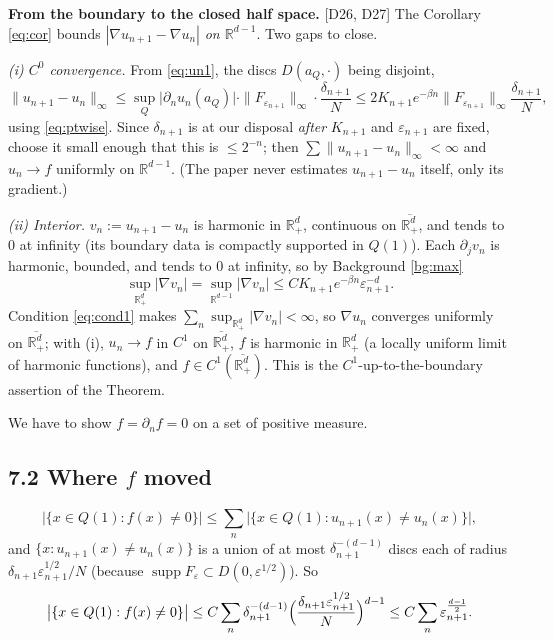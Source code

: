 \documentclass[11pt,reqno]{amsart}
\theoremstyle{plain}
\theoremstyle{definition}
\theoremstyle{plain}
\theoremstyle{definition}
\theoremstyle{remark}
\newcommand{\Rd}{\mathbb{R}^d_+}
\newcommand{\Rdm}{\mathbb{R}^{d-1}}
\newcommand{\nd}{\partial_n}
\DeclareMathOperator{\supp}{supp}
\newcommand{\Ledger}[1]{{\scriptsize\textsf{[#1]}}}
\begin{document}
\begin{filled}
\textbf{From the boundary to the closed half space.} \Ledger{D26, D27} The
Corollary \eqref{eq:cor} bounds $|\nabla u_{n+1}-\nabla u_n|$ \emph{on $\Rdm$}. Two
gaps to close.

\emph{(i) $C^0$ convergence.} From \eqref{eq:un1}, the discs $D(a_Q,\cdot)$ being
disjoint,
\[\|u_{n+1}-u_n\|_\infty
 \le\sup_{Q}\bigl|\nd u_n(a_Q)\bigr|\cdot\|F_{\varepsilon_{n+1}}\|_\infty\cdot
   \frac{\delta_{n+1}}N
 \le 2K_{n+1}e^{-\beta n}\|F_{\varepsilon_{n+1}}\|_\infty\frac{\delta_{n+1}}N,\]
using \eqref{eq:ptwise}. Since $\delta_{n+1}$ is at our disposal \emph{after}
$K_{n+1}$ and $\varepsilon_{n+1}$ are fixed, choose it small enough that this is
$\le2^{-n}$; then $\sum\|u_{n+1}-u_n\|_\infty<\infty$ and $u_n\to f$ uniformly on
$\Rdm$. (The paper never estimates $u_{n+1}-u_n$ itself, only its gradient.)

\emph{(ii) Interior.} $v_n:=u_{n+1}-u_n$ is harmonic in $\Rd$, continuous on
$\overline{\Rd}$, and tends to $0$ at infinity (its boundary data is compactly
supported in $Q(1)$). Each $\partial_jv_n$ is harmonic, bounded, and tends to $0$ at
infinity, so by Background \ref{bg:max}
\[\sup_{\Rd}|\nabla v_n|=\sup_{\Rdm}|\nabla v_n|
 \le CK_{n+1}e^{-\beta n}\varepsilon_{n+1}^{-d}.\]
Condition \eqref{eq:cond1} makes $\sum_n\sup_{\Rd}|\nabla v_n|<\infty$, so
$\nabla u_n$ converges uniformly on $\overline{\Rd}$; with (i), $u_n\to f$ in $C^1$
on $\overline{\Rd}$, $f$ is harmonic in $\Rd$ (a locally uniform limit of harmonic
functions), and $f\in C^1(\overline{\Rd})$. This is the $C^1$-up-to-the-boundary
assertion of the Theorem.
\end{filled}

We have to show $f=\nd f=0$ on a set of positive measure.

\subsection*{7.2 Where $f$ moved}

\begin{equation}\label{eq:fmoved}
 \bigl|\{x\in Q(1):f(x)\ne0\}\bigr|
 \le\sum_n\bigl|\{x\in Q(1):u_{n+1}(x)\ne u_n(x)\}\bigr|,
\end{equation}
and $\{x:u_{n+1}(x)\ne u_n(x)\}$ is a union of at most $\delta_{n+1}^{-(d-1)}$
discs each of radius $\delta_{n+1}\varepsilon_{n+1}^{1/2}/N$ (because
$\supp F_\varepsilon\subset D(0,\varepsilon^{1/2})$). So
\begin{equation}\label{eq:fmeasure}
 \bigl|\{x\in Q(1):f(x)\ne0\}\bigr|
 \le C\sum_n\delta_{n+1}^{-(d-1)}
   \Bigl(\frac{\delta_{n+1}\varepsilon_{n+1}^{1/2}}N\Bigr)^{d-1}
 \le C\sum_n\varepsilon_{n+1}^{\frac{d-1}2}.
\end{equation}
\end{document}
